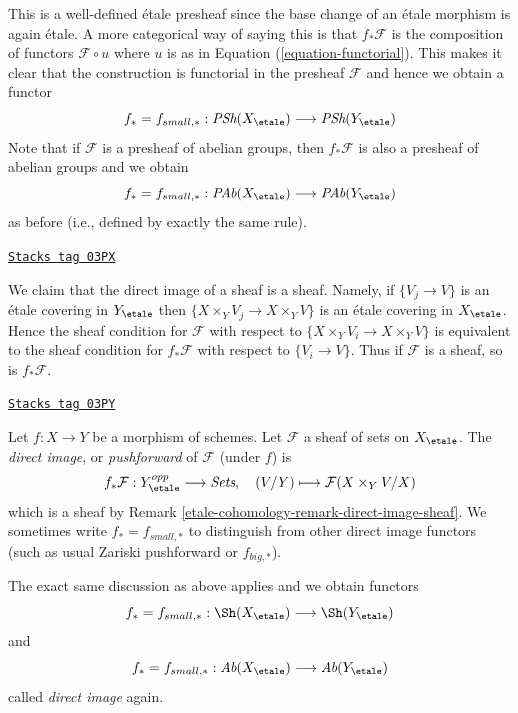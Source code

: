 This is a well-defined \'etale presheaf since the base change of an \'etale
morphism is again \'etale. A more categorical way of saying this is that
$f_*\mathcal{F}$ is the composition of functors $\mathcal{F} \circ u$
where $u$ is as in Equation (\ref{equation-functorial}). This makes it
clear that the construction is functorial in the presheaf
$\mathcal{F}$ and hence we obtain a functor
$$
f_* = f_{small, *} :
\textit{PSh}(X_\etale)
\longrightarrow
\textit{PSh}(Y_\etale)
$$
Note that if $\mathcal{F}$ is a presheaf of abelian groups, then
$f_*\mathcal{F}$ is also a presheaf of abelian groups and we obtain
$$
f_* = f_{small, *} :
\textit{PAb}(X_\etale)
\longrightarrow
\textit{PAb}(Y_\etale)
$$
as before (i.e., defined by exactly the same rule).

\begin{remark}
\label{etale-cohomology-remark-direct-image-sheaf}
\href{https://stacks.math.columbia.edu/tag/03PX}{\texttt{Stacks tag 03PX}}

We claim that the direct image of a sheaf is a sheaf.
Namely, if $\{V_j \to V\}$ is an \'etale covering in $Y_\etale$
then $\{X \times_Y V_j \to X \times_Y V\}$ is an \'etale covering in
$X_\etale$. Hence the sheaf condition for $\mathcal{F}$ with respect
to $\{X \times_Y V_i \to X \times_Y V\}$
is equivalent to the sheaf condition for $f_*\mathcal{F}$ with respect to
$\{V_i \to V\}$. Thus if $\mathcal{F}$ is a sheaf, so is
$f_*\mathcal{F}$.
\end{remark}

\begin{definition}
\label{etale-cohomology-definition-direct-image-sheaf}
\href{https://stacks.math.columbia.edu/tag/03PY}{\texttt{Stacks tag 03PY}}

Let $f: X\to Y$ be a morphism of schemes.
Let $\mathcal{F} $ a sheaf of sets on $X_\etale$.
The {\it direct image}, or {\it pushforward} of $\mathcal{F}$
(under $f$) is
$$
f_*\mathcal{F} : Y_\etale^{opp} \longrightarrow \textit{Sets}, \quad
(V/Y) \longmapsto \mathcal{F}(X \times_Y V/X)
$$
which is a sheaf by
Remark \ref{etale-cohomology-remark-direct-image-sheaf}.
We sometimes write $f_* = f_{small, *}$ to distinguish from other
direct image functors (such as usual Zariski pushforward or $f_{big, *}$).
\end{definition}

The exact same discussion as above applies and we obtain functors
$$
f_* = f_{small, *} :
\Sh(X_\etale)
\longrightarrow
\Sh(Y_\etale)
$$
and
$$
f_* = f_{small, *} :
\textit{Ab}(X_\etale)
\longrightarrow
\textit{Ab}(Y_\etale)
$$
called {\it direct image} again.

